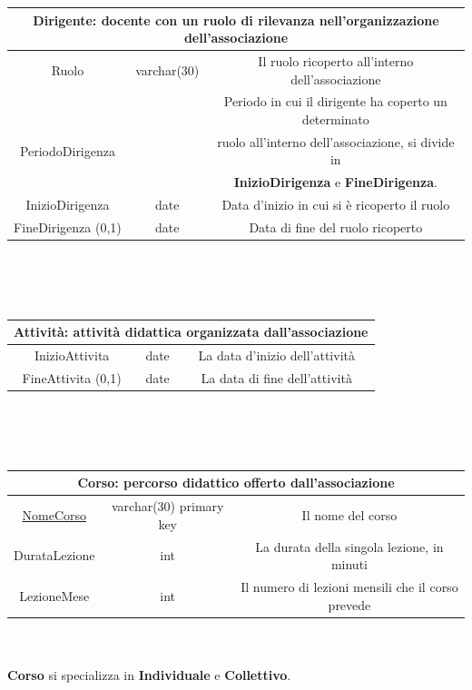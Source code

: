 \documentclass[11pt]{article}
\begin{document}
		\begin{tabular}{|c|c|c|}
			\hline
			\multicolumn{3}{|c|}{\textbf{Dirigente}: docente con un ruolo di rilevanza nell'organizzazione dell'associazione}\\
			\hline
			Ruolo & varchar(30) & Il ruolo ricoperto all'interno dell'associazione\\
			\hline
			&  & Periodo in cui il dirigente ha coperto un determinato\\
			PeriodoDirigenza &  & ruolo all'interno dell'associazione, si divide in\\
			&  &\textbf{InizioDirigenza} e \textbf{FineDirigenza}.\\
			InizioDirigenza & date & Data d'inizio in cui si è ricoperto il ruolo\\
			FineDirigenza (0,1) & date & Data di fine del ruolo ricoperto\\
			\hline
		\end{tabular}
		\\\\\\
		\begin{tabular}{|c|c|c|}
			\hline
			\multicolumn{3}{|c|}{\textbf{Attività}: attività didattica organizzata dall'associazione}\\
			\hline
			InizioAttivita & date & La data d'inizio dell'attività\\
			\hline
			FineAttivita (0,1) & date & La data di fine dell'attività\\
			\hline
		\end{tabular}
		\\\\\\
		\begin{tabular}{|c|c|c|}
			\hline
			\multicolumn{3}{|c|}{\textbf{Corso}: percorso didattico offerto dall'associazione}\\
			\hline
			\underline{NomeCorso} & varchar(30) primary key & Il nome del corso\\
			\hline
			DurataLezione & int & La durata della singola lezione, in minuti\\
			\hline
			LezioneMese & int & Il numero di lezioni mensili che il corso prevede\\
			\hline
		\end{tabular}
		\\\\ \textbf{Corso} si specializza in \textbf{Individuale} e \textbf{Collettivo}.\\\\
\end{document}

